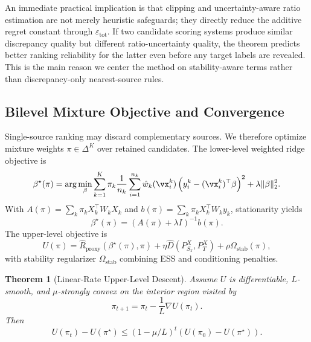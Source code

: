 \documentclass{article} %
\newtheorem{theorem}{Theorem}[section]
\begin{document}
An immediate practical implication is that clipping and uncertainty-aware ratio estimation are not merely heuristic safeguards; they directly reduce the additive regret constant through \(\varepsilon_{\mathrm{tot}}\). If two candidate scoring systems produce similar discrepancy quality but different ratio-uncertainty quality, the theorem predicts better ranking reliability for the latter even before any target labels are revealed. This is the main reason we center the method on stability-aware terms rather than discrepancy-only nearest-source rules.

\subsection{Bilevel Mixture Objective and Convergence}
Single-source ranking may discard complementary sources. We therefore optimize mixture weights \(\pi\in\Delta^K\) over retained candidates. The lower-level weighted ridge objective is
\begin{equation}
\beta^{\star}(\pi)=\arg\min_{\beta}\sum_{k=1}^{K}\pi_k\frac{1}{n_k}\sum_{i=1}^{n_k}\hat w_k(\vx_i^k)\left(y_i^k-(\vx_i^k)^\top\beta\right)^2+\lambda\|\beta\|_2^2.
\label{eq:lower-level}
\end{equation}
With
\(A(\pi)=\sum_k\pi_kX_k^\top W_kX_k\) and
\(b(\pi)=\sum_k\pi_kX_k^\top W_ky_k\), stationarity yields
\begin{equation}
\beta^{\star}(\pi)=\left(A(\pi)+\lambda I\right)^{-1}b(\pi).
\label{eq:closed-form-beta}
\end{equation}
The upper-level objective is
\begin{equation}
U(\pi)=\widehat{R}_{\mathrm{proxy}}(\beta^{\star}(\pi),\pi)+\eta\widehat{D}(P_{S_\pi}^{X},P_T^{X})+\rho\Omega_{\mathrm{stab}}(\pi),
\label{eq:upper-objective}
\end{equation}
with stability regularizer \(\Omega_{\mathrm{stab}}\) combining ESS and conditioning penalties.

\begin{theorem}[Linear-Rate Upper-Level Descent]
\label{thm:convergence}
Assume \(U\) is differentiable, \(L\)-smooth, and \(\mu\)-strongly convex on the interior region visited by
\begin{equation}
\pi_{t+1}=\pi_t-\frac{1}{L}\nabla U(\pi_t).
\label{eq:upper-step}
\end{equation}
Then
\begin{equation}
U(\pi_t)-U(\pi^{\star})\le(1-\mu/L)^t\left(U(\pi_0)-U(\pi^{\star})\right).
\label{eq:linear-rate}
\end{equation}
\end{theorem}
\end{document}
